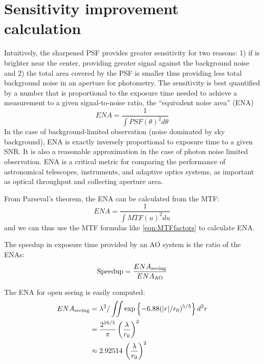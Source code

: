 \documentclass[11pt, oneside]{article}   	%
\begin{document}
\section{Sensitivity improvement calculation}

Intuitively, the sharpened PSF provides greater sensitivity for two reasons: 1) if is brighter near the center, providing greater signal against the background noise and 2) the total area covered by the PSF is smaller thus providing less total background noise in an aperture for photometry. The sensitivity is best quantified by a number that is proportional to the exposure time needed to achieve a measurement to a given signal-to-noise ratio, the ``equivalent noise area'' (ENA)\cite{King1983}
\begin{equation}
ENA = \frac{1}{\int PSF(\theta)^2 d\theta}
\end{equation}
In the case of background-limited observation (noise dominated by sky background), ENA is exactly inversely proportional to exposure time to a given SNR. It is also a reasonable approximation in the case of photon noise limited observation. ENA is a critical metric for comparing the performance of astronomical telescopes, instruments, and adaptive optics systems, as important as optical throughput and collecting aperture area\cite{Angeli2011}.

From Parseval's theorem, the ENA can be calculated from the MTF:
\begin{equation}
ENA = \frac{1}{\int MTF(u)^2 du}
\end{equation}
and we can thus use the MTF formulas like \ref{eqn:MTFfactors} to calculate ENA.

The speedup in exposure time provided by an AO system is the ratio of the ENAs:
\begin{equation}
{\rm Speedup} = \frac{ENA_{\rm seeing}}{ENA_{\rm AO}}
\end{equation}
 
 The ENA for open seeing is easily computed:
 \begin{align}
 ENA_{\rm seeing} &= \lambda^2 / \iint \exp\left\{-6.88 (|r|/r_0)^{5/3}\right\} d^2 r \nonumber \\
                               &= \frac{2^{16/5}}{\pi} \left( \frac{\lambda}{r_0}\right)^2 \nonumber \\
                               &\approx 2.92514\, \left(\frac{\lambda}{r_0} \right)^2
 \end{align}
 
\end{document}
